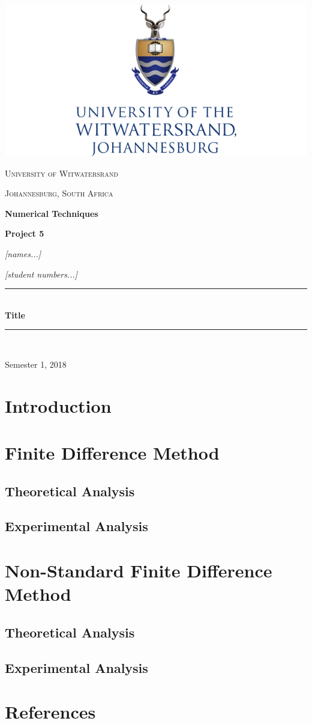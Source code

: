 \documentclass[a4paper]{article}
\begin{document}
\begin{titlepage}
	\centering
	
\includegraphics[scale=0.5]{index.png}
	\vspace{1cm}
	
\newcommand{\HRule}{\rule{\linewidth}{0.5mm}} 

{\scshape\Large University of Witwatersrand\par}
{\scshape\Large Johannesburg, South Africa\par}
	\vspace{1.5cm}
	{\huge\bfseries Numerical Techniques \par}
	\vspace{1cm}
	{\Large\bfseries Project 5 \par}
	\vspace{1cm}
	{\Large\itshape [names...]\par}
	\vspace{0.5cm}
	{\Large\itshape [student numbers...]\par}
	\vfill
	
\HRule \\[0.4cm]
{ \huge \bfseries Title}\\[0.4cm] 
\HRule \\[1.5cm]

	{\large Semester 1, 2018\par}

\end{titlepage}
\section{Introduction}
\section{Finite Difference Method}
\subsection{Theoretical Analysis}
\subsection{Experimental Analysis}
\section{Non-Standard Finite Difference Method}
\subsection{Theoretical Analysis}
\subsection{Experimental Analysis}
\section{References}
\end{document}
